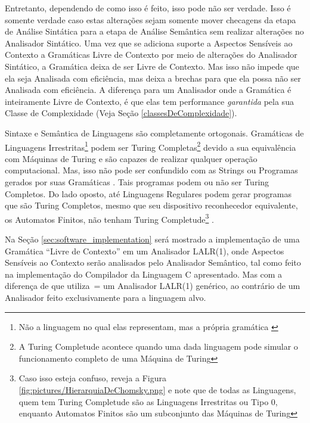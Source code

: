 {    Entretanto,
    dependendo de como isso é feito,
    isso pode não ser verdade.
    Isso é somente verdade caso estas alterações sejam somente mover
    checagens da etapa de Análise Sintática para a etapa de Análise
    Semântica sem realizar alterações no Analisador Sintático.
    Uma vez que se adiciona suporte a Aspectos Sensíveis ao Contexto \cite{contextSensitiveParsing}
    a Gramáticas Livre de Contexto por meio de alterações do Analisador Sintático,
    a Gramática deixa de ser Livre de Contexto.
    Mas isso não impede que ela seja Analisada com eficiência,
    mas deixa a brechas para que ela possa não ser Analisada com eficiência.
    A diferença para um Analisador onde a Gramática é inteiramente Livre de Contexto,
    é que elas tem performance \textit{garantida} pela sua Classe
    de Complexidade (Veja Seção \ref{classesDeComplexidade}).

    Sintaxe e
    Semântica de Linguagens são completamente ortogonais.
    Gramáticas de Linguagens Irrestritas\footnote{
    Não a linguagem no qual elas representam,
    mas a própria gramática \cite{finiteAutomataTuringComplete}
    } podem ser Turing Completas\footnote{
    A Turing Completude acontece quando uma dada linguagem pode simular o funcionamento completo de uma Máquina de Turing }
    devido a sua equivalência com Máquinas de Turing e
    são capazes de realizar qualquer operação computacional.
    Mas,
    isso não pode ser confundido com as Strings ou
    Programas gerados por suas Gramáticas \cite{areThereDomainSpecificLanguages}.
    Tais programas podem ou
    não ser Turing Completos.
    Do lado oposto,
    até Linguagens Regulares podem gerar programas que são Turing Completos,
    mesmo que seu dispositivo reconhecedor equivalente,
    os Automatos Finitos,
    não tenham Turing Completude\footnote{
    Caso isso esteja confuso,
    reveja a Figura \ref{fig:pictures/HierarquiaDeChomsky.png}
    e note que de todas as Linguagens,
    quem tem Turing Completude são as Linguagens Irrestritas ou
    Tipo 0,
    enquanto Automatos Finitos são um subconjunto das Máquinas de Turing }
    \cite{turingCompleteRegularLanguages,finiteAutomataTuringComplete}.

    Na Seção \ref{sec:software_implementation} será mostrado a implementação de
    uma Gramática ``Livre de Contexto'' em um Analisador LALR(1),
    onde Aspectos Sensíveis ao Contexto serão analisados pelo Analisador Semântico,
    tal como feito na implementação do Compilador da Linguagem C apresentado.
    Mas com a diferença de que utiliza~= um Analisador LALR(1) genérico,
    ao contrário de um Analisador feito exclusivamente para a linguagem alvo.


}
